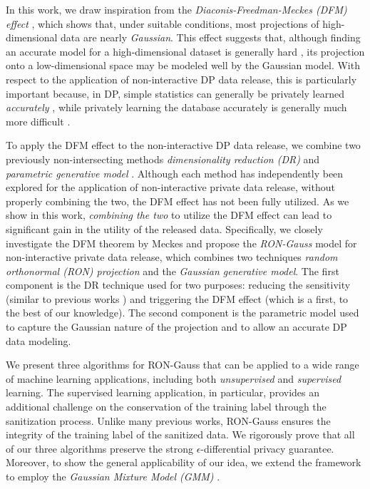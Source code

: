 \documentclass[USenglish,oneside,twocolumn]{article}
\theoremstyle{definition}
\theoremstyle{remark}
\theoremstyle{plain}
\theoremstyle{plain}
\begin{document}
In this work, we draw inspiration from the \emph{Diaconis-Freedman-Meckes
(DFM) effect} \cite{RefWorks:439}, which shows that, under suitable
conditions, most projections of high-dimensional data are nearly
\emph{Gaussian}. This effect suggests that, although finding an accurate
model for a high-dimensional dataset is generally hard \cite{RefWorks:448}\cite[chapter 7]{RefWorks:376},
its projection onto a low-dimensional space may be modeled well by
the Gaussian model. With respect to the application of non-interactive
DP data release, this is particularly important because, in DP, simple
statistics can generally be privately learned \emph{accurately} \cite{RefWorks:477,RefWorks:478},
while privately learning the database accurately is generally much
more difficult \cite{RefWorks:527,RefWorks:530,RefWorks:479}.

To apply the DFM effect to the non-interactive DP data release, we
combine two previously non-intersecting methods \textendash{} \emph{dimensionality
reduction (DR)} \cite{RefWorks:313,RefWorks:314,RefWorks:337,RefWorks:338,RefWorks:339,RefWorks:224}
and \emph{parametric generative model} \cite{RefWorks:238,RefWorks:187,RefWorks:333,RefWorks:334,RefWorks:335,RefWorks:336,RefWorks:384}.
Although each method has independently been explored for the application
of non-interactive private data release, without properly combining
the two, the DFM effect has not been fully utilized. As we show in
this work, \emph{combining the two} to utilize the DFM effect can
lead to significant gain in the utility of the released data. Specifically,
we closely investigate the DFM theorem by Meckes \cite{RefWorks:439}
and propose the \emph{RON-Gauss} model
for non-interactive private data release, which combines two techniques
\textendash{} \emph{random orthonormal (RON) projection} and the \emph{Gaussian
generative model}. The first component is the DR technique used for
two purposes: reducing the sensitivity (similar to previous works \cite{RefWorks:313,RefWorks:314,RefWorks:337,RefWorks:338,RefWorks:339,RefWorks:224}) and triggering
the DFM effect (which is a first, to the
best of our knowledge). The second component is the parametric model used
to capture the Gaussian nature of the projection and to allow an accurate DP data modeling.

We present three algorithms for RON-Gauss
that can be applied to a wide range of machine learning applications,
including both \emph{unsupervised} and \emph{supervised} learning.
The supervised learning application, in particular, provides an additional
challenge on the conservation of the training label through the sanitization
process. Unlike many previous works, RON-Gauss ensures the integrity
of the training label of the sanitized data. We rigorously prove
that all of our three algorithms preserve the strong $\epsilon$-differential
privacy guarantee. Moreover, to show the general applicability of
our idea, we extend the framework to employ the \emph{Gaussian Mixture
Model (GMM)} \cite{RefWorks:225,RefWorks:51}.
\end{document}

